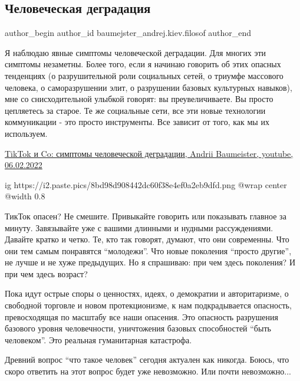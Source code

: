  
 
 
 
 
 
\subsection{Человеческая деградация}
\label{sec:06_02_2022.fb.baumejster_andrej.kiev.filosof.1.chelovek_degradacia}
 
\ifcmt
 author_begin
   author_id baumejster_andrej.kiev.filosof
 author_end
\fi

Я наблюдаю явные симптомы человеческой деградации. Для многих эти симптомы
незаметны. Более того, если я начинаю говорить об этих опасных тенденциях (о
разрушительной роли социальных сетей, о триумфе массового человека, о
саморазрушении элит, о разрушении базовых культурных навыков), мне со
снисходительной улыбкой говорят: вы преувеличиваете. Вы просто цепляетесь за
старое. Те же социальные сети, все эти новые технологии коммуникации - это
просто инструменты. Все зависит от того, как мы их используем. 

\href{https://www.youtube.com/watch?v=VP7xBTn3nNs}{%
TikTok и Co: симптомы человеческой деградации, Andrii Baumeister, youtube, 06.02.2022%
}

\ifcmt
  ig https://i2.paste.pics/8bd98d908442dc60f38e4ef0a2eb9dfd.png
  @wrap center
  @width 0.8
\fi

ТикТок опасен? Не смешите. Привыкайте говорить или показывать главное за
минуту. Завязывайте уже с вашими длинными и нудными рассуждениями. Давайте
кратко и четко.  Те, кто так говорят, думают, что они современны. Что они тем
самым понравятся \enquote{молодежи}. Что новые поколения \enquote{просто
другие}, не лучше и не хуже предыдущих. Но я спрашиваю: при чем здесь
поколения? И при чем здесь возраст? 

Пока идут острые споры о ценностях, идеях, о демократии и авторитаризме, о
свободной торговле и новом протекционизме, к нам подкрадывается опасность,
превосходящая по масштабу все наши опасения. Это опасность разрушения базового
уровня человечности, уничтожения базовых способностей \enquote{быть человеком}.
Это реальная гуманитарная катастрофа. 

Древний вопрос \enquote{что такое человек} сегодня актуален как никогда. Боюсь,
что скоро ответить на этот  вопрос будет уже невозможно. Или почти
невозможно...
